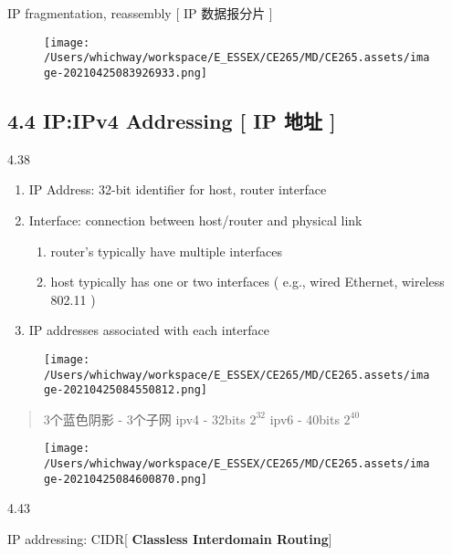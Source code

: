\documentclass[
]{article}
\begin{document}
IP fragmentation, reassembly {[} IP 数据报分片 {]}

\begin{figure}
\centering
\texttt{[image: /Users/whichway/workspace/E\_ESSEX/CE265/MD/CE265.assets/image-20210425083926933.png]}
\caption{}
\end{figure}

\hypertarget{44-ipipv4-addressing--ip-ux5730ux5740-}{%
\subsection{4.4 IP:IPv4 Addressing {[} IP 地址
{]}}\label{44-ipipv4-addressing--ip-ux5730ux5740-}}

4.38

\begin{enumerate}
\def\labelenumi{\arabic{enumi}.}
\item
  IP Address: 32-bit identifier for host, router interface
\item
  Interface: connection between host/router and physical link

  \begin{enumerate}
  \def\labelenumii{\arabic{enumii}.}
  \item
    router's typically have multiple interfaces
  \item
    host typically has one or two interfaces ( e.g., wired Ethernet,
    wireless 802.11 )
  \end{enumerate}
\item
  IP addresses associated with each interface
\end{enumerate}

\begin{figure}
\centering
\texttt{[image: /Users/whichway/workspace/E\_ESSEX/CE265/MD/CE265.assets/image-20210425084550812.png]}
\caption{}
\end{figure}

\begin{quote}
3个蓝色阴影 - 3个子网 ipv4 - 32bits \(2^{32}\) ipv6 - 40bits \(2^{40}\)
\end{quote}

\begin{figure}
\centering
\texttt{[image: /Users/whichway/workspace/E\_ESSEX/CE265/MD/CE265.assets/image-20210425084600870.png]}
\caption{}
\end{figure}

4.43

IP addressing: CIDR{[} \textbf{Classless Interdomain Routing}{]}
\end{document}

